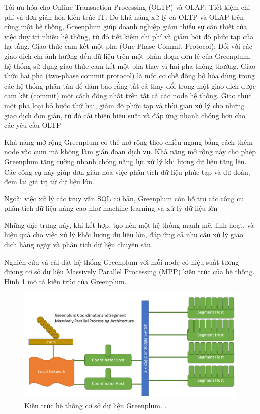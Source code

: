 \documentclass{article}[14pt]
\begin{document}
{{Tối ưu hóa cho Online Transaction Processing (OLTP) và OLAP: Tiết kiệm chi phí và đơn giản hóa kiến trúc IT: Do khả năng xử lý cả
OLTP và OLAP trên cùng một hệ thống, Greenplum giúp doanh
nghiệp giảm thiểu sự cần thiết của việc duy trì nhiều hệ thống, từ đó
tiết kiệm chi phí và giảm bớt độ phức tạp của hạ tầng. Giao thức cam kết một pha (One-Phase Commit Protocol): Đối với
các giao dịch chỉ ảnh hưởng đến dữ liệu trên một phân đoạn đơn lẻ
của Greenplum, hệ thống sử dụng giao thức cam kết một pha thay vì
hai pha thông thường. Giao thức hai pha (two-phase commit protocol) là một cơ chế đồng bộ
hóa dùng trong các hệ thống phân tán để đảm bảo rằng tất cả thay đổi
trong một giao dịch được cam kết (commit) một cách đồng nhất trên
tất cả các node hệ thống. Giao thức một pha loại bỏ bước thứ hai,
giảm độ phức tạp và thời gian xử lý cho những giao dịch đơn giản, từ
đó cải thiện hiệu suất và đáp ứng nhanh chóng hơn cho các yêu cầu
OLTP

Khả năng mở rộng Greenplum có thể mở rộng theo chiều ngang bằng cách thêm node vào cụm mà không làm gián đoạn dịch vụ. Khả năng mở rộng này cho phép Greenplum tăng cường nhanh chóng năng lực xử lý khi lượng dữ liệu tăng lên.
Các công cụ này giúp đơn giản hóa việc phân tích dữ liệu phức tạp và
dự đoán, đem lại giá trị từ dữ liệu lớn.

Ngoài việc xử lý các truy vấn SQL cơ bản, Greenplum còn hỗ trợ các
công cụ phân tích dữ liệu nâng cao như machine learning và xử lý dữ
liệu lớn


Những đặc trưng này, khi kết hợp, tạo nên một hệ thống mạnh mẽ, linh hoạt,
và hiệu quả cho việc xử lý khối lượng dữ liệu lớn, đáp ứng cả nhu cầu xử lý
giao dịch hàng ngày và phân tích dữ liệu chuyên sâu.



Nghiên cứu và cài đặt hệ thống Greenplum với mỗi node có hiệu suất tương
đương cơ sở dữ liệu Massively Parallel Processing (MPP) kiến trúc của hệ
thống. Hình \ref{fig:gp-architecture} mô tả kiến trúc của Greenplum.

\begin{figure}[htbp]
\centerline{\includegraphics[scale=.4]{images/gp-architecture.png}}
\captionsetup{font=Large}
\caption{Kiến trúc hệ thống cơ sở dữ liệu Greenplum. \cite{vmware_greenplum}. }
\label{fig:gp-architecture}
\end{figure}

}}
\end{document}
